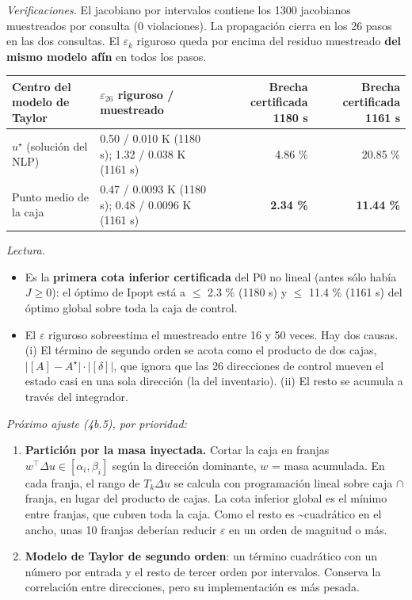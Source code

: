 \documentclass[11pt,a4paper]{article}
\begin{document}
\emph{Verificaciones.} El jacobiano por intervalos contiene los 1300 jacobianos muestreados por consulta (0 violaciones). La propagación cierra en los 26 pasos en las dos consultas. El $\varepsilon_k$ riguroso queda por encima del residuo muestreado \textbf{del mismo modelo afín} en todos los pasos.

{\footnotesize
\begin{xltabular}{\linewidth}{@{}YYRR@{}}
\toprule
\textbf{Centro del modelo de Taylor} & \textbf{$\varepsilon_{26}$ riguroso / muestreado} & \textbf{Brecha certificada 1180 s} & \textbf{Brecha certificada 1161 s} \\
\midrule
\endhead
$u^\star$ (solución del NLP) & 0.50 / 0.010 K (1180 s); 1.32 / 0.038 K (1161 s) & 4.86 \% & 20.85 \% \\
Punto medio de la caja & 0.47 / 0.0093 K (1180 s); 0.48 / 0.0096 K (1161 s) & \textbf{2.34 \%} & \textbf{11.44 \%} \\
\bottomrule
\end{xltabular}}

\emph{Lectura.}

\begin{itemize}
\item Es la \textbf{primera cota inferior certificada} del P0 no lineal (antes sólo había $J\ge0$): el óptimo de Ipopt está a $\le$ 2.3 \% (1180 s) y $\le$ 11.4 \% (1161 s) del óptimo global sobre toda la caja de control.
\item El $\varepsilon$ riguroso sobreestima el muestreado entre 16 y 50 veces. Hay dos causas. (i) El término de segundo orden se acota como el producto de dos cajas, $\lvert[A]-A^\star\rvert\cdot\lvert[\delta]\rvert$, que ignora que las 26 direcciones de control mueven el estado casi en una sola dirección (la del inventario). (ii) El resto se acumula a través del integrador.
\end{itemize}

\emph{Próximo ajuste (4b.5), por prioridad:}

\begin{enumerate}
\item \textbf{Partición por la masa inyectada.} Cortar la caja en franjas $w^\top\Delta u\in[\alpha_i,\beta_i]$ según la dirección dominante, $w$ = masa acumulada. En cada franja, el rango de $T_k\Delta u$ se calcula con programación lineal sobre caja $\cap$ franja, en lugar del producto de cajas. La cota inferior global es el mínimo entre franjas, que cubren toda la caja. Como el resto es \textasciitilde{}cuadrático en el ancho, unas 10 franjas deberían reducir $\varepsilon$ en un orden de magnitud o más.
\item \textbf{Modelo de Taylor de segundo orden}: un término cuadrático con un número por entrada y el resto de tercer orden por intervalos. Conserva la correlación entre direcciones, pero su implementación es más pesada.
\end{enumerate}
\end{document}
